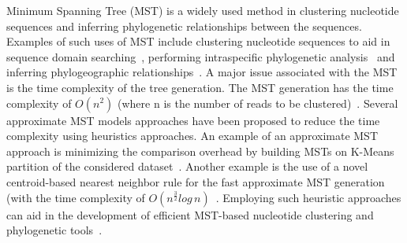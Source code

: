 Minimum Spanning Tree (MST) is a widely used method in clustering
nucleotide sequences and inferring phylogenetic relationships between
the sequences. Examples of such uses of MST include clustering
nucleotide sequences to aid in sequence domain
searching~\cite{guan-98}, performing intraspecific phylogenetic
analysis~\cite{rohl-99} and inferring phylogeographic
relationships~\cite{baric-03}.  A major issue associated with the MST
is the time complexity of the tree generation. The MST generation has
the time complexity of $O(n^{2})$ (where n is the number of reads to
be clustered)~\cite{caiming-13}.  Several approximate MST models
approaches have been proposed to reduce the time complexity using
heuristics approaches.  An example of an approximate MST approach is
minimizing the comparison overhead by building MSTs on K-Means
partition of the considered dataset~\cite{caiming-13}.  Another
example is the use of a novel centroid-based nearest neighbor rule for
the fast approximate MST generation (with the time complexity of $O(n
^{\frac{3}{2}} log\,n)$~\cite{jothi-18}. Employing such heuristic
approaches can aid in the development of efficient MST-based
nucleotide clustering and phylogenetic tools~\cite{rohl-99}.
